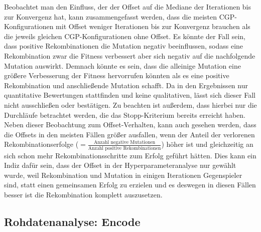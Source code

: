 Beobachtet man den Einfluss, der der Offset auf die Mediane der Iterationen bis zur Konvergenz hat, kann zusammengefasst werden, dass die meisten CGP-Konfigurationen mit Offset weniger Iterationen bis zur Konvergenz brauchen als die jeweils gleichen CGP-Konfigurationen ohne Offset.
Es könnte der Fall sein, dass positive Rekombinationen die Mutation negativ beeinflussen, sodass eine Rekombination zwar die Fitness verbessert aber sich negativ auf die nachfolgende Mutation auswirkt.
Demnach könnte es sein, dass die alleinige Mutation eine größere Verbesserung der Fitness hervorrufen könnten als es eine positive Rekombination und anschließende Mutation schafft.
Da in den Ergebnissen nur quantitative Bewertungen stattfinden und keine qualitativen, lässt sich dieser Fall nicht ausschließen oder bestätigen.
Zu beachten ist außerdem, dass hierbei nur die Durchläufe betrachtet werden, die das Stopp-Kriterium bereits erreicht haben.\\
Neben dieser Beobachtung zum Offset-Verhalten, kann auch gesehen werden, dass die Offsets in den meisten Fällen größer ausfallen, wenn der Anteil der verlorenen Rekombinationserfolge ($= \frac{\text{Anzahl negative Mutationen}}{\text{Anzahl positive Rekombinationen}}$) höher ist und gleichzeitig an sich schon mehr Rekombinationsschritte zum Erfolg geführt hätten.
Dies kann ein Indiz dafür sein, dass der Offset in der Hyperparameteranalyse nur gewählt wurde, weil Rekombination und Mutation in einigen Iterationen Gegenspieler sind, statt einen gemeinsamen Erfolg zu erzielen und es deswegen in diesen Fällen besser ist die Rekombination komplett auszusetzen.



\subsection{Rohdatenanalyse: Encode}
\label{subsec:rohdatenEncode}

